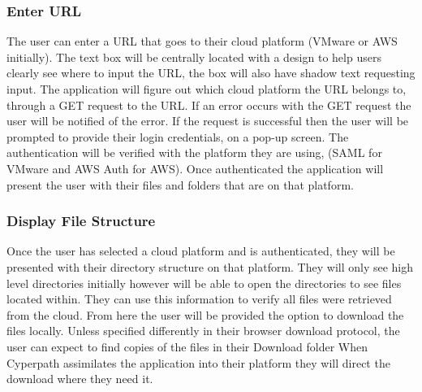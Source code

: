 \documentclass{article}
\begin{document}
            \subsubsection{Enter URL}
            The user can enter a URL that goes to their cloud platform (VMware or AWS initially). The text box will be centrally located with a design to help users clearly
            see where to input the URL, the box will also have shadow text requesting input. The application will figure out which cloud platform the URL belongs to, through a GET 
            request to the URL. If an error occurs with the GET request the user will be notified of the error. If the request is successful then the user will be prompted to
            provide their login credentials, on a pop-up screen. The authentication will be verified with the platform they are using, (SAML for VMware and AWS Auth for AWS).
            Once authenticated the application will present the user with their files and folders that are on that platform.
            

            \subsubsection{Display File Structure}
            Once the user has selected a cloud platform and is authenticated, they will be presented with their directory structure on that platform. They will only see high level directories initially
            however will be able to open the directories to see files located within. They can use this information to verify all files were retrieved from the cloud. From here the user will be 
            provided the option to download the files locally. Unless specified differently in their browser download protocol, the user can expect to find copies of the files in their Download folder
            When Cyperpath assimilates the application into their platform they will direct the download where they need it.
\end{document}
